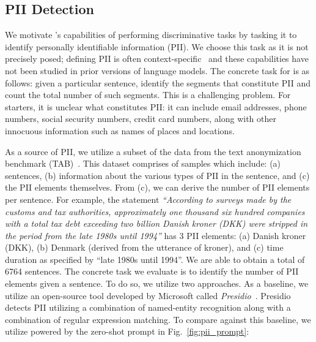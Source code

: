 \subsection{PII Detection}

We motivate \DV's capabilities of performing discriminative tasks by tasking it to identify personally identifiable information (PII). We choose this task as it is not precisely posed; defining PII is often context-specific~\cite{nissenbaum2009privacy} and these capabilities have not been studied in prior versions of language models. The concrete task for \DV is as follows: given a particular sentence, identify the segments that constitute PII and count the total number of such segments. This is a challenging problem. For starters, it is unclear what constitutes PII: it can include email addresses, phone numbers, social security numbers, credit card numbers, along with other innocuous information such as names of places and locations. 

As a source of PII, we utilize a subset of the data from the text anonymization benchmark (TAB)~\cite{pilan2022text}. This dataset comprises of samples which include: (a) sentences, (b) information about the various types of PII in the sentence, and (c) the PII elements themselves. From (c), we can derive the number of PII elements per sentence. For example, the statement \textit{``According to surveys made by the customs and tax authorities, approximately one thousand six hundred companies with a total tax debt exceeding two billion Danish kroner (DKK) were stripped in the period from the late 1980s until 1994''} has 3 PII elements: (a) Danish kroner (DKK), (b) Denmark (derived from the utterance of kroner), and (c) time duration as specified by ``late 1980s until 1994''. We are able to obtain a total of 6764 sentences. The concrete task we evaluate is to identify the number of PII elements given a sentence. To do so, we utilize two approaches. As a baseline, we utilize an open-source tool developed by Microsoft called \textit{Presidio}~\cite{payne2020privacy}. Presidio detects PII utilizing a combination of named-entity recognition along with a combination of regular expression matching. To compare against this baseline, we utilize \DV powered by the zero-shot prompt in Fig.~\ref{fig:pii_prompt}: 


